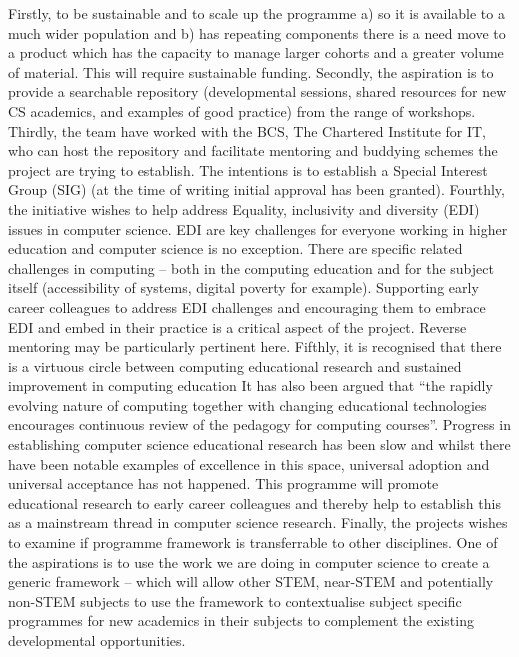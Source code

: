 \documentclass[sigconf]{acmart}
\begin{document}
Firstly, to be sustainable and to scale up the programme a) so it is available to a much wider population and b) has repeating components there is a need move to a  product which has the capacity to manage larger cohorts and a greater volume of material. This will require sustainable funding. Secondly, the aspiration is to provide  a searchable repository (developmental sessions, shared resources for new CS academics, and examples of good practice) from the range of workshops. Thirdly, the team have worked with the BCS, The Chartered Institute for IT, who can host the repository and facilitate mentoring and buddying schemes the project are trying to establish. The intentions is to establish a Special Interest Group (SIG) (at the time of writing initial approval has been granted). Fourthly, the initiative wishes to help address Equality, inclusivity and diversity (EDI) issues in computer science. EDI are key challenges for everyone working in higher education and computer science is no exception. There are specific related challenges in computing – both in the computing education and for the subject itself (accessibility of systems, digital poverty for example). Supporting early career colleagues to address EDI challenges and encouraging them to embrace EDI and embed in their practice is a critical aspect of the project. Reverse mentoring may be particularly pertinent here. Fifthly, it is recognised that there is a virtuous circle between computing educational research and sustained improvement in computing education \cite{Porter2021} It has also been argued that \cite[p.~12]{Iroms2004}“the rapidly evolving nature of computing together with changing educational technologies encourages continuous review of the pedagogy for computing courses”. Progress in establishing computer science educational research has been slow and whilst there have been notable examples of excellence in this space, universal adoption and universal acceptance has not happened. This programme will promote educational research to early career colleagues and thereby help to establish this as a mainstream thread in computer science research. Finally, the projects wishes to examine if programme framework is transferrable to other disciplines. One of the aspirations is to use the work we are doing in computer science to create a generic framework – which will allow other STEM, near-STEM and potentially non-STEM subjects to use the framework to contextualise subject specific programmes for new academics in their subjects to complement the existing developmental opportunities. 
\end{document}
